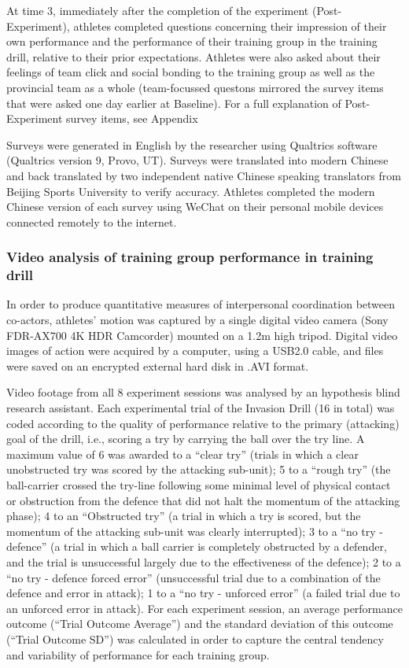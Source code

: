 At time 3, immediately after the completion of the experiment (Post-Experiment), athletes completed questions concerning their impression of their own performance and the performance of their training group in the training drill, relative to their prior expectations.  Athletes were also asked about their feelings of team click and social bonding to the training group as well as the provincial team as a whole (team-focussed questons mirrored the survey items that were asked one day earlier at Baseline).  For a full explanation of Post-Experiment survey items, see Appendix

Surveys were generated in English by the researcher using Qualtrics software (Qualtrics version 9, Provo, UT). Surveys were translated into modern Chinese and back translated by two independent native Chinese speaking translators from Beijing Sports University to verify accuracy.  Athletes completed the modern Chinese version of each survey using WeChat on their personal mobile devices connected remotely to the internet.


\subsubsection{Video analysis of training group performance in training drill}
In order to produce quantitative measures of interpersonal coordination between co-actors, athletes’ motion was captured by a single digital video camera (Sony FDR-AX700 4K HDR Camcorder) mounted on a 1.2m high tripod. Digital video images of action were acquired by a computer, using a USB2.0 cable, and files were saved on an encrypted external hard disk in .AVI format.

Video footage from all 8 experiment sessions was analysed by an hypothesis blind research assistant.  Each experimental trial of the Invasion Drill (16 in total) was coded according to the quality of performance relative to the primary (attacking) goal of the drill, i.e., scoring a try by carrying the ball over the try line.  A maximum value of 6 was awarded to a ``clear try'' (trials in which a clear unobstructed try was scored by the attacking sub-unit); 5 to a ``rough try'' (the ball-carrier crossed the try-line following some minimal level of physical contact or obstruction from the defence that did not halt the momentum of the attacking phase); 4 to an ``Obstructed try'' (a trial in which a try is scored, but the momentum of the attacking sub-unit was clearly interrupted); 3 to a ``no try - defence''  (a trial in which a ball carrier is completely obstructed by a defender, and the trial is unsuccessful largely due to the effectiveness of the defence); 2 to a ``no try - defence forced error'' (unsuccessful trial due to a combination of the defence and error in attack); 1 to a ``no try - unforced error'' (a failed trial due to an unforced error in attack).
For each experiment session, an average performance outcome (``Trial Outcome Average'') and the standard deviation of this outcome (``Trial Outcome SD'') was calculated in order to capture the central tendency and variability of performance for each training group.

